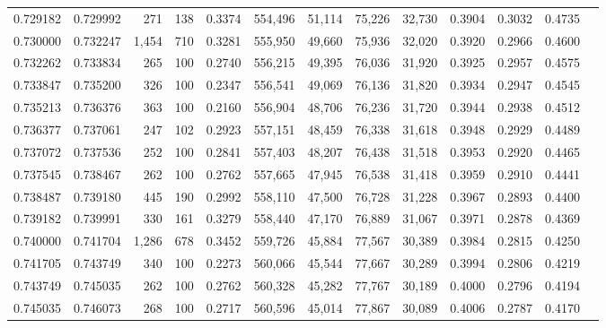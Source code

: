 \begin{tabular}{rrrrrrrrrrrrr}
0.729182 & 0.729992 &   271 & 138 &                                     0.3374 & 554,496 &  51,114 &  75,226 &  32,730 & 0.3904 & 0.3032 & 0.4735 \\
0.730000 & 0.732247 & 1,454 & 710 &                                     0.3281 & 555,950 &  49,660 &  75,936 &  32,020 & 0.3920 & 0.2966 & 0.4600 \\
0.732262 & 0.733834 &   265 & 100 &                                     0.2740 & 556,215 &  49,395 &  76,036 &  31,920 & 0.3925 & 0.2957 & 0.4575 \\
0.733847 & 0.735200 &   326 & 100 &                                     0.2347 & 556,541 &  49,069 &  76,136 &  31,820 & 0.3934 & 0.2947 & 0.4545 \\
0.735213 & 0.736376 &   363 & 100 &                                     0.2160 & 556,904 &  48,706 &  76,236 &  31,720 & 0.3944 & 0.2938 & 0.4512 \\
0.736377 & 0.737061 &   247 & 102 &                                     0.2923 & 557,151 &  48,459 &  76,338 &  31,618 & 0.3948 & 0.2929 & 0.4489 \\
0.737072 & 0.737536 &   252 & 100 &                                     0.2841 & 557,403 &  48,207 &  76,438 &  31,518 & 0.3953 & 0.2920 & 0.4465 \\
0.737545 & 0.738467 &   262 & 100 &                                     0.2762 & 557,665 &  47,945 &  76,538 &  31,418 & 0.3959 & 0.2910 & 0.4441 \\
0.738487 & 0.739180 &   445 & 190 &                                     0.2992 & 558,110 &  47,500 &  76,728 &  31,228 & 0.3967 & 0.2893 & 0.4400 \\
0.739182 & 0.739991 &   330 & 161 &                                     0.3279 & 558,440 &  47,170 &  76,889 &  31,067 & 0.3971 & 0.2878 & 0.4369 \\
0.740000 & 0.741704 & 1,286 & 678 &                                     0.3452 & 559,726 &  45,884 &  77,567 &  30,389 & 0.3984 & 0.2815 & 0.4250 \\
0.741705 & 0.743749 &   340 & 100 &                                     0.2273 & 560,066 &  45,544 &  77,667 &  30,289 & 0.3994 & 0.2806 & 0.4219 \\
0.743749 & 0.745035 &   262 & 100 &                                     0.2762 & 560,328 &  45,282 &  77,767 &  30,189 & 0.4000 & 0.2796 & 0.4194 \\
0.745035 & 0.746073 &   268 & 100 &                                     0.2717 & 560,596 &  45,014 &  77,867 &  30,089 & 0.4006 & 0.2787 & 0.4170 \\

\end{tabular}
